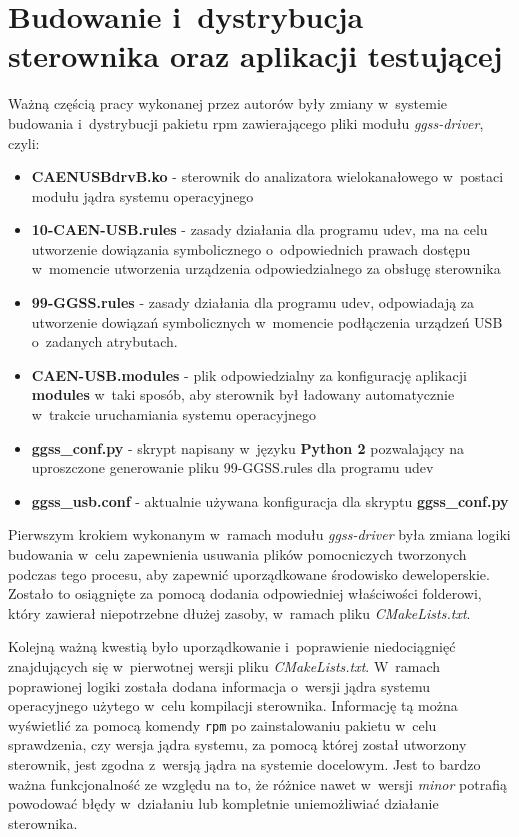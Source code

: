\newpage
\section{Budowanie i~dystrybucja sterownika oraz aplikacji testującej}
\label{section:driver}

Ważną częścią pracy wykonanej przez autorów były zmiany w~systemie budowania i~dystrybucji pakietu \gls*{rpm} zawierającego pliki modułu \textit{ggss-driver}, czyli:
\begin{itemize}
\item \textbf{CAENUSBdrvB.ko} - sterownik do analizatora wielokanałowego w~postaci modułu jądra systemu operacyjnego
\item \textbf{10-CAEN-USB.rules} - zasady działania dla programu udev, ma na celu utworzenie dowiązania symbolicznego o~odpowiednich prawach dostępu w~momencie utworzenia urządzenia odpowiedzialnego za obsługę sterownika
\item \textbf{99-GGSS.rules} - zasady działania dla programu udev, odpowiadają za utworzenie dowiązań symbolicznych w~momencie podłączenia urządzeń USB o~zadanych atrybutach.
\item \textbf{CAEN-USB.modules} - plik odpowiedzialny za konfigurację aplikacji \textbf{modules} w~taki sposób, aby sterownik był ładowany automatycznie w~trakcie uruchamiania systemu operacyjnego
\item \textbf{ggss\_conf.py} - skrypt napisany w~języku \textbf{Python 2} pozwalający na uproszczone generowanie pliku 99-GGSS.rules dla programu udev
\item \textbf{ggss\_usb.conf} - aktualnie używana konfiguracja dla skryptu \textbf{ggss\_conf.py}
\end{itemize}

Pierwszym krokiem wykonanym w~ramach modułu \textit{ggss-driver} była zmiana logiki budowania w~celu zapewnienia usuwania plików pomocniczych tworzonych podczas tego procesu, aby zapewnić uporządkowane środowisko deweloperskie. Zostało to osiągnięte za pomocą dodania odpowiedniej właściwości folderowi, który zawierał niepotrzebne dłużej zasoby, w~ramach pliku \textit{CMakeLists.txt}. \par
Kolejną ważną kwestią było uporządkowanie i~poprawienie niedociągnięć znajdujących się w~pierwotnej wersji pliku \textit{CMakeLists.txt}. W~ramach poprawionej logiki została dodana informacja o~wersji jądra systemu operacyjnego użytego w~celu kompilacji sterownika. Informację tą można wyświetlić za pomocą komendy \lstinline{rpm} po zainstalowaniu pakietu w~celu sprawdzenia, czy wersja jądra systemu, za pomocą której został utworzony sterownik, jest zgodna z~wersją jądra na systemie docelowym. Jest to bardzo ważna funkcjonalność ze względu na to, że różnice nawet w~wersji \textit{minor} potrafią powodować błędy w~działaniu lub kompletnie uniemożliwiać działanie sterownika.

